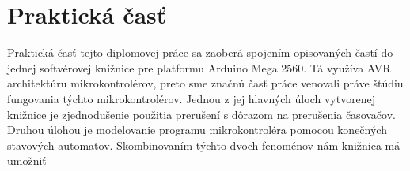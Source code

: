 \section{Praktická časť}
\noindent

Praktická časť tejto diplomovej práce sa zaoberá spojením opisovaných častí do jednej softvérovej knižnice pre platformu Arduino Mega 2560. Tá využíva AVR
architektúru mikrokontrolérov, preto sme značnú časť práce venovali práve štúdiu fungovania týchto mikrokontrolérov.
Jednou z jej hlavných úloch vytvorenej knižnice je zjednodušenie použitia prerušení s dôrazom na prerušenia časovačov. Druhou úlohou je modelovanie programu mikrokontroléra pomocou konečných stavových automatov. Skombinovaním týchto dvoch fenoménov
nám knižnica má umožniť